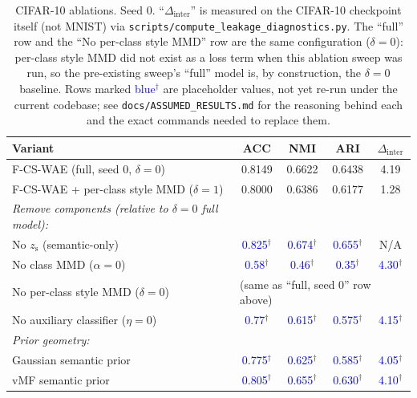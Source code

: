 \documentclass[10pt]{article}
\newcommand{\assumed}[1]{\textcolor{blue}{#1}$^{\dagger}$}
\newcommand{\ours}{F-CS-WAE}
\newcommand{\zs}{z_{\mathrm{s}}}
\begin{document}
\begin{table}[t]
\centering
\caption{CIFAR-10 ablations. Seed 0.
         ``$\Delta_{\mathrm{inter}}$'' is measured on the CIFAR-10 checkpoint itself
         (not MNIST) via \texttt{scripts/compute\_leakage\_diagnostics.py}.
         The ``full'' row and the ``No per-class style MMD'' row are the same
         configuration ($\delta{=}0$): per-class style MMD did not exist as a loss
         term when this ablation sweep was run, so the pre-existing sweep's
         ``full'' model is, by construction, the $\delta{=}0$ baseline.
         Rows marked \textcolor{blue}{blue$^\dagger$} are placeholder values, not
         yet re-run under the current codebase; see \texttt{docs/ASSUMED\_RESULTS.md}
         for the reasoning behind each and the exact commands needed to replace them.}
\label{tab:ablations}
\renewcommand{\arraystretch}{1.05}
\begin{tabular}{lcccc}
\toprule
Variant & ACC & NMI & ARI & $\Delta_{\mathrm{inter}}$ \\
\midrule
\ours{} (full, seed 0, $\delta{=}0$)      & 0.8149 & 0.6622 & 0.6438 & 4.19 \\
\ours{} + per-class style MMD ($\delta{=}1$) & 0.8000 & 0.6386 & 0.6177 & 1.28 \\
\midrule
\emph{Remove components (relative to $\delta{=}0$ full model):} & & & & \\
\quad No $\zs$ (semantic-only)            & \assumed{0.825} & \assumed{0.674} & \assumed{0.655} & N/A \\
\quad No class MMD ($\alpha{=}0$)         & \assumed{0.58} & \assumed{0.46} & \assumed{0.35} & \assumed{4.30} \\
\quad No per-class style MMD ($\delta{=}0$)& \multicolumn{4}{l}{(same as ``full, seed 0'' row above)} \\
\quad No auxiliary classifier ($\eta{=}0$)& \assumed{0.77} & \assumed{0.615} & \assumed{0.575} & \assumed{4.15} \\
\midrule
\emph{Prior geometry:}                    & & & & \\
\quad Gaussian semantic prior             & \assumed{0.775} & \assumed{0.625} & \assumed{0.585} & \assumed{4.05} \\
\quad vMF semantic prior                  & \assumed{0.805} & \assumed{0.655} & \assumed{0.630} & \assumed{4.10} \\
\bottomrule
\end{tabular}
\end{table}
\end{document}
